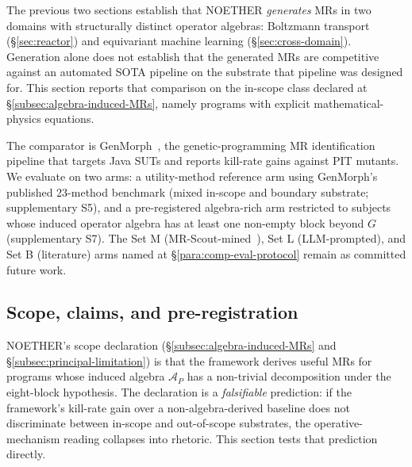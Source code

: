 The previous two sections establish that NOETHER \emph{generates} MRs
in two domains with structurally distinct operator algebras: Boltzmann
transport (\S\ref{sec:reactor}) and equivariant machine learning
(\S\ref{sec:cross-domain}). Generation alone does not establish that
the generated MRs are competitive against an automated SOTA pipeline
on the substrate that pipeline was designed for. This section reports
that comparison on the in-scope class declared at
\S\ref{subsec:algebra-induced-MRs}, namely programs with explicit
mathematical-physics equations.

The comparator is GenMorph~\cite{Ayerdi2023GenMorph}, the
genetic-programming MR identification pipeline that targets Java SUTs
and reports kill-rate gains against PIT mutants. We evaluate on two
arms: a utility-method reference arm using GenMorph's published
23-method benchmark (mixed in-scope and boundary substrate; supplementary
S5), and a pre-registered algebra-rich arm restricted to subjects whose
induced operator algebra has at least one non-empty block beyond $G$
(supplementary S7). The Set M (MR-Scout-mined~\cite{MRScout2024}),
Set L (LLM-prompted), and Set B (literature) arms named at
\S\ref{para:comp-eval-protocol} remain as committed future work.

\subsection{Scope, claims, and pre-registration}
\label{subsec:empirical-scope}

NOETHER's scope declaration (\S\ref{subsec:algebra-induced-MRs} and
\S\ref{subsec:principal-limitation}) is that the framework derives
useful MRs for programs whose induced algebra $\mathcal{A}_P$ has a
non-trivial decomposition under the eight-block hypothesis. The
declaration is a \emph{falsifiable} prediction: if the framework's
kill-rate gain over a non-algebra-derived baseline does not
discriminate between in-scope and out-of-scope substrates, the
operative-mechanism reading collapses into rhetoric. This section
tests that prediction directly.

